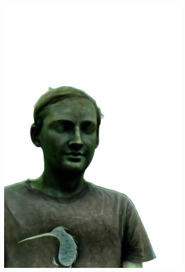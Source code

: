 \begin{figure}[ht]
\begin{subfigure}{0.08\linewidth}
        \includegraphics[width=\textwidth]{Figures/results/high/simon_stone/11_render.png}
	\end{subfigure}
    \begin{subfigure}{0.08\linewidth}%

\end{subfigure}
\end{figure}
